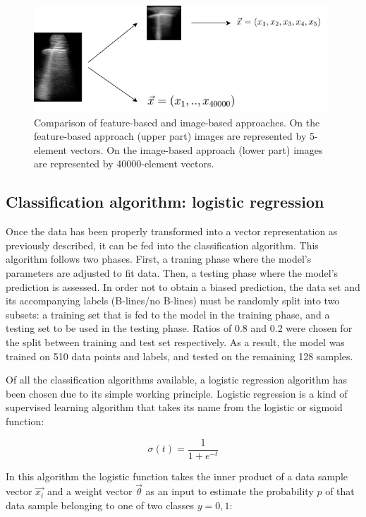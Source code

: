 \documentclass[12pt]{article} %
\begin{document}
	\begin{figure}[h]
	\centering
	\includegraphics[width=11cm]{figuras/diagrama.png}
	\caption{\small Comparison of feature-based and image-based approaches. On the feature-based approach (upper part) images are represented by 5-element vectors. On the image-based approach (lower part) images are represented by 40000-element vectors.}
	\label{diagrama}
	\end{figure}
	
\subsection{Classification algorithm: logistic regression}
	Once the data has been properly transformed into a vector representation as previously described, it can be fed into the classification algorithm. This algorithm follows two phases. First, a traning phase where the model's parameters are adjusted to fit data. Then, a testing phase where the model's prediction is assessed. In order not to obtain a biased prediction, the data set and its accompanying labels (B-lines/no B-lines) must be randomly split into two subsets: a training set that is fed to the model in the training phase, and a testing set to be used in the testing phase. Ratios of 0.8 and 0.2 were chosen for the split between training and test set respectively. As a result, the model was trained on 510 data points and labels, and tested on the remaining 128 samples.

	Of all the classification algorithms available, a logistic regression algorithm has been chosen due to its simple working principle. Logistic regression is a kind of supervised learning algorithm that takes its name from the logistic or sigmoid function:
	
  \begin{equation}
    \sigma(t) = \frac{1}{1+ e^{-t}}
  \end{equation}	
  
  In this algorithm the logistic function takes the inner product of a data sample vector $\vec{x_i}$ and a weight vector $\vec{\theta}$ as an input to estimate the probability $p$ of that data sample belonging to one of two classes $y=0,1$:
  
\end{document}
